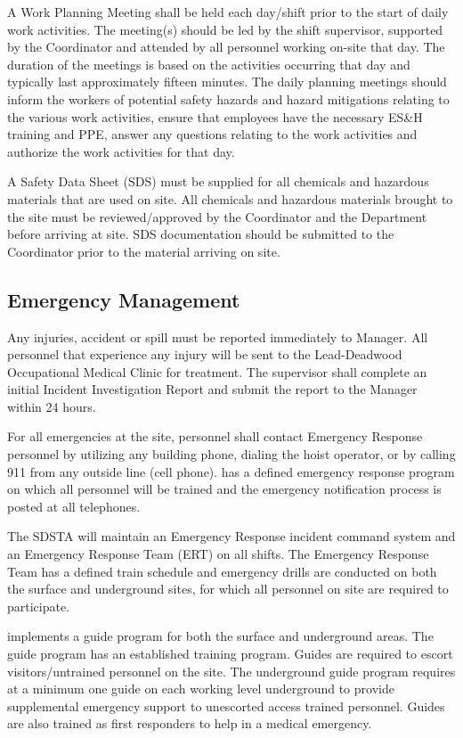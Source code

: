 A Work Planning Meeting shall be held each day/shift prior to the
start of daily work activities. The meeting(s) should be led by the
shift supervisor, supported by the  Coordinator and
attended by all personnel working on-site that day. The duration of
the meetings is based on the activities occurring that day and
typically last approximately fifteen minutes. The daily planning
meetings should inform the workers of potential safety hazards and
hazard mitigations relating to the various work activities, ensure
that employees have the necessary ES\&H training and PPE, answer any
questions relating to the work activities and authorize the work
activities for that day.

A Safety Data Sheet (SDS) must be supplied for all chemicals and
hazardous materials that are used on site. All chemicals and hazardous
materials brought to the \surf site must be reviewed/approved by the
  Coordinator and the \surf {}
Department before arriving at site.  SDS documentation should be
submitted to the   Coordinator prior to the
material arriving on site.

\subsection{Emergency Management}

Any injuries, accident or spill must be reported immediately to 
 Manager. All personnel that experience any injury will be sent to
the Lead-Deadwood Occupational Medical Clinic for treatment. The
supervisor shall complete an initial Incident Investigation Report and
submit the report to the   Manager within 24 hours.

For all emergencies at the \surf site, personnel shall contact
Emergency Response personnel by utilizing any building phone, dialing
the hoist operator, or by calling 911 from any outside line (cell
phone).  \surf has a defined emergency response program on which all
personnel will be trained and the emergency notification process is
posted at all telephones.

The SDSTA will maintain an Emergency Response incident command system
and an Emergency Response Team (ERT) on all shifts. The Emergency
Response Team has a defined train schedule and emergency drills are
conducted on both the surface and underground sites, for which all
personnel on site are required to participate.

\surf implements a guide program for both the surface and underground
areas. The guide program has an established training program. Guides
are required to escort visitors/untrained personnel on the \surf
site. The underground guide program requires at a minimum one guide on
each working level underground to provide supplemental emergency
support to unescorted access trained personnel. Guides are also
trained as first responders to help in a medical emergency.

